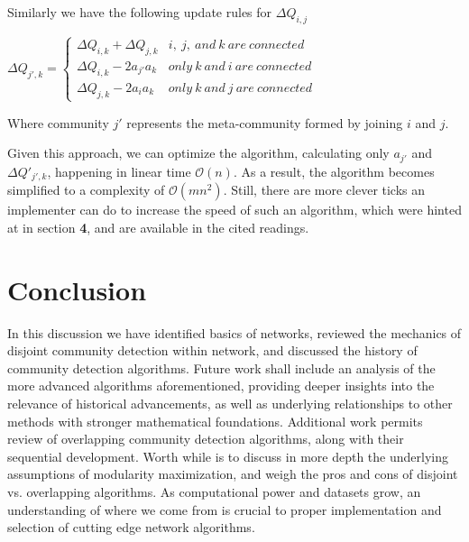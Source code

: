 \documentclass[a4paper, 10pt, twocolumn]{article}
\newcommand{\ds}{\displaystyle}
\begin{document}
\noindent
Similarly we have the following update rules for $ \Delta Q_{i, j} $

\vspace{2.5mm}
$
\ds \Delta Q_{j', k} =
\begin{cases} \ds
       \Delta Q_{i, k} + \Delta Q_{j, k} & i, \ j, \ and \ k \ are \ connected \\
       \Delta Q_{i, k} - 2a_{j'}a_{k} & only \ k \ and \ i \ are \ connected \\
       \Delta Q_{j, k} - 2a_{i}a_{k} & only \ k \ and \ j \ are \ connected
\end{cases}
$
\vspace{2.5mm}

\noindent
Where community $ j' $ represents the meta-community formed by joining $ i $ and $ j $.

Given this approach, we can optimize the algorithm, calculating only $ a_{j'} $ and $ \Delta Q'_{j', k} $, happening in linear time $ \mathcal{O}(n) $.
As a result, the algorithm becomes simplified to a complexity of $ \mathcal{O}(mn^{2}) $.
Still, there are more clever ticks an implementer can do to increase the speed of such an algorithm, which were hinted at in section \textbf{4}, and are available in the cited readings.

\section{Conclusion}

In this discussion we have identified basics of networks, reviewed the mechanics of disjoint community detection within network, and discussed the history of community detection algorithms.
Future work shall include an analysis of the more advanced algorithms aforementioned, providing deeper insights into the relevance of historical advancements, as well as underlying relationships to other methods with stronger mathematical foundations.
Additional work permits review of overlapping community detection algorithms, along with their sequential development.
Worth while is to discuss in more depth the underlying assumptions of modularity maximization, and weigh the pros and cons of disjoint vs. overlapping algorithms.
As computational power and datasets grow, an understanding of where we come from is crucial to proper implementation and selection of cutting edge network algorithms.



{}
\end{document}
